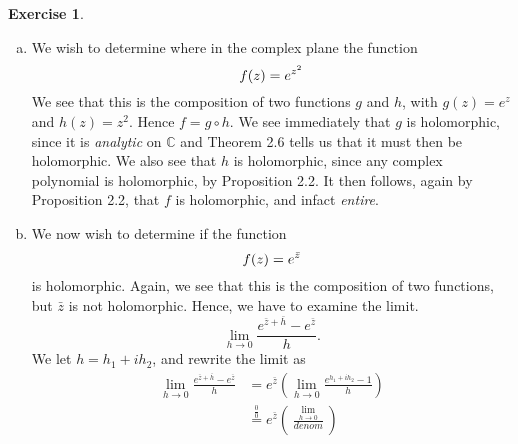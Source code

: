 \documentclass[10pt]{amsart}
\newcommand{\C}{\mathbb{C}}
\theoremstyle{definition}
\newtheorem{exercise}{Exercise}
\newcommand{\limh}{\lim_{h \to 0}}
\begin{document}
\begin{exercise}\hfill
  \begin{enumerate}[a)]
    \item We wish to determine where in the complex plane the function
      \begin{equation}
        \notag
        f(z) = e^{z^2}
      \end{equation}
      We see that this is the composition of two functions $g$ and $h$, with
      $g(z) = e^z$ and $h(z) = z^2$. Hence $f = g \circ h$.  We see immediately
      that $g$ is holomorphic, since it is \emph{analytic} on $\C$ and Theorem
      2.6 tells us that it must then be holomorphic. We also see that $h$ is
      holomorphic, since any complex polynomial is holomorphic, by Proposition
      2.2. It then follows, again by Proposition 2.2, that $f$ is holomorphic, and infact \emph{entire}.
    \item We now wish to determine if the function
      \begin{equation}
        \notag
        f(z) = e^{\bar{z}}
      \end{equation}
      is holomorphic. Again, we see that this is the composition of two functions, but $\bar{z}$ is not holomorphic. Hence, we have to examine the limit.
      \begin{equation}
        \label{eq:lim}
        \lim_{h \to 0} \frac{e^{\bar{z} + \bar{h}} - e^{\bar{z}}}{h}.
      \end{equation}
      We let $h = h_1 + ih_2$, and rewrite the limit as
      \begin{align*}
        \lim_{h \to 0} \frac{e^{\bar{z} + \bar{h}} - e^{\bar{z}}}{h} &= e^{\bar{z}} \left( \limh \frac{e^{h_1+ih_2} - 1}{h} \right) \\
                                                                     &\overset{\frac{0}{0}}{=} e^{\bar{z}} \left( \frac{\limh }{denom} \right)
      \end{align*}
    
  \end{enumerate} 
\end{exercise}
\end{document}
